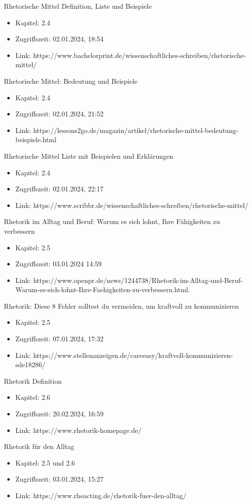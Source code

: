Rhetorische Mittel Definition, Liste und Beispiele
\begin{itemize}
    \item Kapitel: 2.4
    \item Zugriffszeit: 02.01.2024, 18:54
    \item Link: https://www.bachelorprint.de/wissenschaftliches-schreiben/rhetorische-mittel/ 
\end{itemize}
Rhetorische Mittel: Bedeutung und Beispiele
\begin{itemize}
    \item Kapitel: 2.4
    \item Zugriffszeit: 02.01.2024, 21:52  
    \item Link: https://lessons2go.de/magazin/artikel/rhetorische-mittel-bedeutung-beispiele.html
\end{itemize}
Rhetorische Mittel Liste mit Beispielen und Erklärungen
\begin{itemize}
    \item Kapitel: 2.4
    \item Zugriffszeit: 02.01.2024, 22:17 
    \item Link: https://www.scribbr.de/wissenschaftliches-schreiben/rhetorische-mittel/    
\end{itemize}
Rhetorik im Alltag und Beruf: Warum es sich lohnt, Ihre Fähigkeiten zu verbessern
\begin{itemize}
    \item Kapitel: 2.5
    \item Zugriffszeit: 03.01.2024 14:59  
    \item Link: https://www.openpr.de/news/1244738/Rhetorik-im-Alltag-und-Beruf-Warum-es-sich-lohnt-Ihre-Faehigkeiten-zu-verbessern.html.   
\end{itemize}
Rhetorik: Diese 8 Fehler solltest du vermeiden, um kraftvoll zu kommunizieren
\begin{itemize}
    \item Kapitel: 2.5
    \item Zugriffszeit: 07.01.2024, 17:32  
    \item Link: https://www.stellenanzeigen.de/careeasy/kraftvoll-kommunizieren-sde18286/   
\end{itemize}
Rhetorik Definition
\begin{itemize}
    \item Kapitel: 2.6
    \item Zugriffszeit: 20.02.2024, 16:59  
    \item Link: https://www.rhetorik-homepage.de/
\end{itemize}
Rhetorik für den Alltag
\begin{itemize}
    \item Kapitel: 2.5 und 2.6 
    \item Zugriffszeit: 03.01.2024, 15:27   
    \item Link: https://www.rheacting.de/rhetorik-fuer-den-alltag/  
\end{itemize}